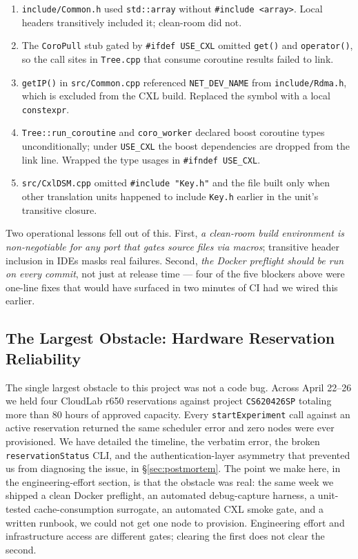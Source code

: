 \documentclass[11pt,a4paper]{article}
\begin{document}
\begin{enumerate}[nosep]
    \item \texttt{include/Common.h} used \texttt{std::array} without \texttt{\#include <array>}. Local headers transitively included it; clean-room did not.
    \item The \texttt{CoroPull} stub gated by \texttt{\#ifdef USE\_CXL} omitted \texttt{get()} and \texttt{operator()}, so the call sites in \texttt{Tree.cpp} that consume coroutine results failed to link.
    \item \texttt{getIP()} in \texttt{src/Common.cpp} referenced \texttt{NET\_DEV\_NAME} from \texttt{include/Rdma.h}, which is excluded from the CXL build. Replaced the symbol with a local \texttt{constexpr}.
    \item \texttt{Tree::run\_coroutine} and \texttt{coro\_worker} declared boost coroutine types unconditionally; under \texttt{USE\_CXL} the boost dependencies are dropped from the link line. Wrapped the type usages in \texttt{\#ifndef USE\_CXL}.
    \item \texttt{src/CxlDSM.cpp} omitted \texttt{\#include "Key.h"} and the file built only when other translation units happened to include \texttt{Key.h} earlier in the unit's transitive closure.
\end{enumerate}

Two operational lessons fell out of this. First, \emph{a clean-room build environment is non-negotiable for any port that gates source files via macros}; transitive header inclusion in IDEs masks real failures. Second, \emph{the Docker preflight should be run on every commit}, not just at release time --- four of the five blockers above were one-line fixes that would have surfaced in two minutes of CI had we wired this earlier.

\subsection{The Largest Obstacle: Hardware Reservation Reliability}
\label{sec:effort-reservations}

The single largest obstacle to this project was not a code bug. Across April 22--26 we held four CloudLab r650 reservations against project \texttt{CS620426SP} totaling more than 80 hours of approved capacity. Every \texttt{startExperiment} call against an active reservation returned the same scheduler error and zero nodes were ever provisioned. We have detailed the timeline, the verbatim error, the broken \texttt{reservationStatus} CLI, and the authentication-layer asymmetry that prevented us from diagnosing the issue, in §\ref{sec:postmortem}. The point we make here, in the engineering-effort section, is that the obstacle was real: the same week we shipped a clean Docker preflight, an automated debug-capture harness, a unit-tested cache-consumption surrogate, an automated CXL smoke gate, and a written runbook, we could not get one node to provision. Engineering effort and infrastructure access are different gates; clearing the first does not clear the second.
\end{document}

